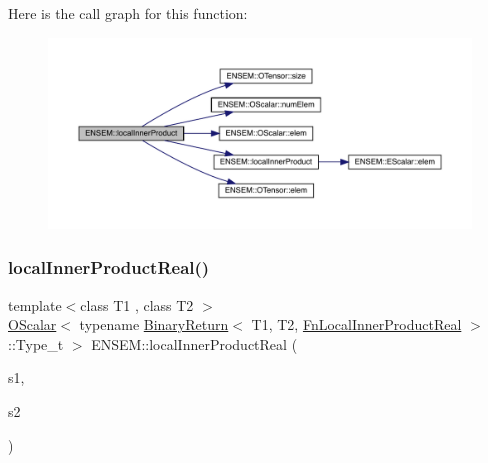 Here is the call graph for this function\+:\nopagebreak
\begin{figure}[H]
\begin{center}
\leavevmode
\includegraphics[width=350pt]{de/d87/group__obstensor_gaffb6c3d07f9c4ba10a5712ce49725d68_cgraph}
\end{center}
\end{figure}
\mbox{\label{group__obstensor_ga39e2368c90f850b08cd366076195fbc4}} 
\subsubsection{\texorpdfstring{localInnerProductReal()}{localInnerProductReal()}}
{\footnotesize\ttfamily template$<$class T1 , class T2 $>$ \\
\mbox{\hyperlink{classENSEM_1_1OScalar}{O\+Scalar}}$<$ typename \mbox{\hyperlink{structENSEM_1_1BinaryReturn}{Binary\+Return}}$<$ T1, T2, \mbox{\hyperlink{structENSEM_1_1FnLocalInnerProductReal}{Fn\+Local\+Inner\+Product\+Real}} $>$\+::Type\+\_\+t $>$ E\+N\+S\+E\+M\+::local\+Inner\+Product\+Real (\begin{DoxyParamCaption}\item[{const \mbox{\hyperlink{classENSEM_1_1OTensor}{O\+Tensor}}$<$ T1 $>$ \&}]{s1,  }\item[{const \mbox{\hyperlink{classENSEM_1_1OTensor}{O\+Tensor}}$<$ T2 $>$ \&}]{s2 }\end{DoxyParamCaption})\hspace{0.3cm}{\ttfamily [inline]}}

